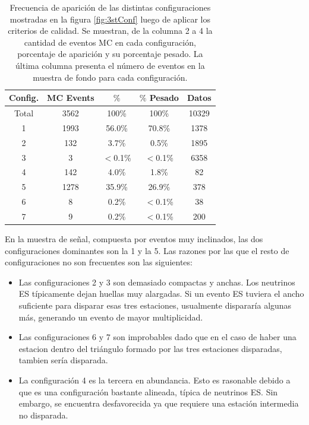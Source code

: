 		\begin{table}[!h]
		\centering
		\begin{tabular}{|c|c|c|c|c|}
		\hline
		Config. & MC Events & $\%$ & $\%$ Pesado & Datos                  \\
		\hline
		Total & 3562 & 100\% & 100\%& 10329\\
		\hline
		1 & 1993 & 56.0\% & 70.8\% & 1378\\
		2 & 132 & 3.7\% & 0.5\% & 1895\\
		3 & 3 & $<$0.1\% & $<$0.1\% & 6358\\
		4 & 142 & 4.0\% & 1.8\% & 82\\
		5 & 1278 & 35.9\% & 26.9\% & 378\\
		6 & 8 & 0.2\% & $<$0.1\% & 38\\
		7 & 9 & 0.2\% & $<$0.1\% & 200\\
		\hline
		\end{tabular}
		\caption{
		\label{tab:3stConf}
		Frecuencia de aparición de las distintas configuraciones mostradas en la figura \ref{fig:3stConf} luego de aplicar los criterios de calidad.
		Se muestran, de la columna 2 a 4 la cantidad de eventos MC en cada configuración, porcentaje de aparición y su porcentaje pesado.
		La última columna presenta el número de eventos en la muestra de fondo para cada configuración.
		}
		\end{table}
		En la muestra de señal, compuesta por eventos muy inclinados, las dos configuraciones dominantes son la 1 y la 5. Las razones por las que el resto de configuraciones no son frecuentes son las siguientes:
		\begin{itemize}
		 \item Las configuraciones 2 y 3 son demasiado compactas y anchas. Los neutrinos ES típicamente dejan huellas muy alargadas. Si un evento ES tuviera el ancho suficiente para disparar esas tres estaciones, usualmente dispararía algunas más, generando un evento de mayor multiplicidad.
		 \item Las configuraciones 6 y 7 son improbables dado que en el caso de haber una estacion dentro del triángulo formado por las tres estaciones disparadas, tambien sería disparada.
		 \item La configuración 4 es la tercera en abundancia. Esto es rasonable debido a que es una configuración bastante alineada, típica de neutrinos ES. Sin embargo, se encuentra desfavorecida ya que requiere una estación intermedia no disparada.
		\end{itemize}
		
